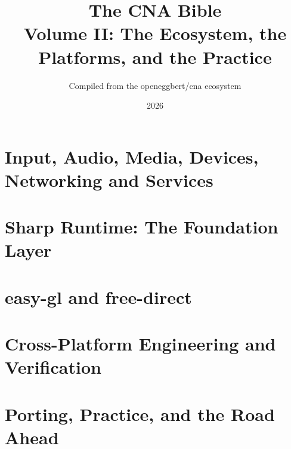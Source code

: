 \documentclass[11pt,twoside,openright]{book}
\title{The CNA Bible \\ \Large Volume II: The Ecosystem, the Platforms, and the Practice}
\author{Compiled from the openeggbert/cna ecosystem}
\date{2026}
\begin{document}
\frontmatter


\tableofcontents

\mainmatter

\part{Input, Audio, Media, Devices, Networking and Services}









\part{Sharp Runtime: The Foundation Layer}




\part{easy-gl and free-direct}



\part{Cross-Platform Engineering and Verification}





\part{Porting, Practice, and the Road Ahead}








\appendix






\backmatter
\printindex
\end{document}
